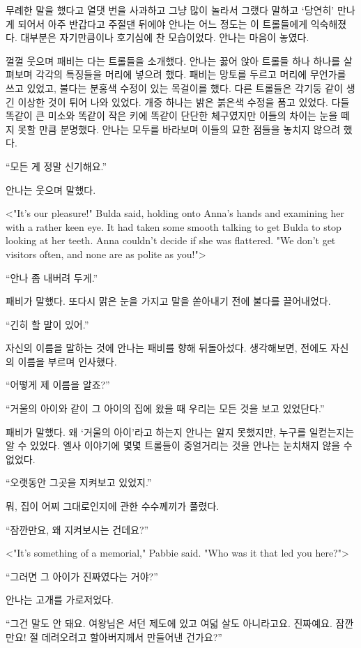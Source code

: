 무례한 말을 했다고 열댓 번을 사과하고 그냥 많이 놀라서 그랬다 말하고 `당연히' 만나게 되어서 아주 반갑다고 주절댄 뒤에야 안나는 어느 정도는 이 트롤들에게 익숙해졌다. 대부분은 자기만큼이나 호기심에 찬 모습이었다. 안나는 마음이 놓였다.

껄껄 웃으며 패비는 다는 트롤들을 소개했다. 안나는 꿇어 앉아 트롤들 하나 하나를 살펴보며 각각의 특징들을 머리에 넣으려 했다. 패비는 망토를 두르고 머리에 무언가를 쓰고 있었고, 불다는 분홍색 수정이 있는 목걸이를 했다. 다른 트롤들은 각기둥 같이 생긴 이상한 것이 튀어 나와 있었다. 개중 하나는 밝은 붉은색 수정을 품고 있었다. 다들 똑같이 큰 미소와 똑같이 작은 키에 똑같이 단단한 체구였지만 이들의 차이는 눈을 떼지 못할 만큼 분명했다. 안나는 모두를 바라보며 이들의 묘한 점들을 놓치지 않으려 했다.

``모든 게 정말 신기해요.''

안나는 웃으며 말했다.

<"It's our pleasure!" Bulda said, holding onto Anna's hands and examining her with a rather keen eye. It had taken some smooth talking to get Bulda to stop looking at her teeth. Anna couldn't decide if she was flattered. "We don't get visitors often, and none are as polite as you!">

``안나 좀 내버려 두게.''

패비가 말했다. 또다시 맑은 눈을 가지고 말을 쏟아내기 전에 불다를 끌어내었다.

``긴히 할 말이 있어.''

자신의 이름을 말하는 것에 안나는 패비를 향해 뒤돌아섰다. 생각해보면, 전에도 자신의 이름을 부르며 인사했다.

``어떻게 제 이름을 알죠?''

``거울의 아이와 같이 그 아이의 집에 왔을 때 우리는 모든 것을 보고 있었단다.''

패비가 말했다. 왜 `거울의 아이'라고 하는지 안나는 알지 못했지만, 누구를 일컫는지는 알 수 있었다. 엘사 이야기에 몇몇 트롤들이 중얼거리는 것을 안나는 눈치채지 않을 수 없었다.

``오랫동안 그곳을 지켜보고 있었지.''

뭐, 집이 어찌 그대로인지에 관한 수수께끼가 풀렸다.

``잠깐만요, 왜 지켜보시는 건데요?''

<"It's something of a memorial," Pabbie said. "Who was it that led you here?">

``그러면 그 아이가 진짜였다는 거야?''

안나는 고개를 가로저었다.

``그건 말도 안 돼요. 여왕님은 서던 제도에 있고 여덟 살도 아니라고요. 진짜예요. 잠깐만요! 절 데려오려고 할아버지께서 만들어낸 건가요?''

